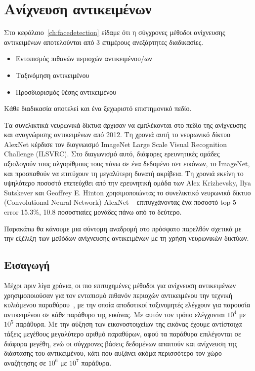 \chapter{Ανίχνευση αντικειμένων}\label{ch:objectdetection}


Στο κεφάλαιο~\ref{ch:facedetection} είδαμε ότι η σύγχρονες μέθοδοι ανίχνευσης αντικειμένων
αποτελούνται από 3 επιμέρους ανεξάρτητες διαδικασίες.
\begin{itemize}
    \item Εντοπισμός πιθανών περιοχών αντικειμένου/ων
    \item Ταξινόμηση αντικειμένου
    \item Προσδιορισμός θέσης αντικειμένου
\end{itemize}

Κάθε διαδικασία αποτελεί και ένα ξεχωριστό επιστημονικό πεδίο.

Τα συνελικτικά νευρωνικά δίκτυα άρχισαν να εμπλέκονται στο πεδίο της ανίχνευσης
και αναγνώρισης αντικειμένων από 2012. Τη χρονιά αυτή το νευρωνικό δίκτυο AlexNet
κέρδισε τον διαγνωισμό ImageNet Large Scale Visual Recognition Challenge (ILSVRC).
Στο διαγωνισμό αυτό, διάφορες ερευνητικές ομάδες αξιολογούν τους αλγορίθμους τους
πάνω σε ένα δεδομένο σετ εικόνων, το ImageNet,
και προσπαθούν να επιτύχουν τη μεγαλύτερη δυνατή ακρίβεια. Τη χρονιά εκείνη το
υψηλότερο ποσοστό επετεύχθει από την ερευνητική ομάδα των Alex Krizhevsky,
Ilya Sutskever και Geoffrey E. Hinton χρησιμοποιώντας το συνελικτικό νευρωνικό
δίκτυο (Convolutional Neural Network) AlexNet ~\cite{NIPS2012_4824} επιτυγχάνοντας
ένα ποσοστό top-5 error 15.3\%, 10.8 ποσοστιαίες μονάδες πάνω από το δεύτερο.

Παρακάτω θα κάνουμε μια σύντομη αναδρομή στο πρόσφατο παρελθόν σχετικά με την
εξέλιξη των μεθόδων ανίχνευσης αντικειμένων με τη χρήση νευρωνικών δικτύων.

\section{Εισαγωγή}\label{sec:objintro}

Μέχρι πριν λίγα χρόνια, οι πιο επιτυχημένες μέθοδοι για ανίχνευση αντικειμένων
χρησιμοποιούσαν για τον εντοπισμό πιθανόν περιοχών αντικειμένου την τεχνική
κυλιόμενου παραθύρου~\cite{Viola2004, Papageorgiou:2000:TSO:355338.355341, 5255236}, με την οποία
αποδοτικοί ταξινομητές ελέγχουν για παρουσία αντικειμένου σε κάθε παράθυρο της
εικόνας. Με αυτόν τον τρόπο ελέγχονται $10^4$ με $10^5$ παράθυρα. Με την αύξηση των
εικονοστοιχείων της εικόνας έχουμε αντίστοιχα τάξεις μεγέθους μεγαλύτερο αριθμό παραθύρων,
αφού τα παράθυρα επιλέγονται σε διάφορα μεγέθη, ενώ οι σύγχρονες βάσεις δεδομένων
απαιτούν και ανίχνευση της διάστασης του αντικειμένου, κάτι που αυξάνει ακόμα
περισσότερο τον χώρο αναζήτησης σε $10^6$ με $10^7$ παράθυρα.

